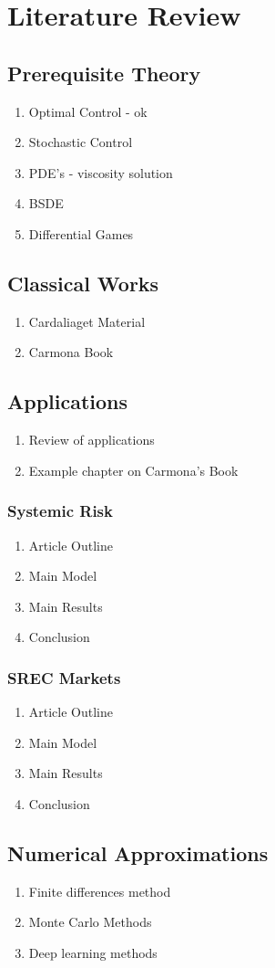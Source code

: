 \section{Literature Review}
\subsection{Prerequisite Theory}
\begin{enumerate}
    \item Optimal Control - ok
    \item Stochastic Control
    \item PDE's - viscosity solution
    \item BSDE
    \item Differential Games
\end{enumerate}

\subsection{Classical Works}
\begin{enumerate}
    \item Cardaliaget Material
    \item Carmona Book
\end{enumerate}

\subsection{Applications}
\begin{enumerate}
    \item Review of applications
    \item Example chapter on Carmona's Book
\end{enumerate}

\subsubsection{Systemic Risk}

\begin{enumerate}
    \item Article Outline
    \item Main Model
    \item Main Results
    \item Conclusion
\end{enumerate}

\subsubsection{SREC Markets}

\begin{enumerate}
    \item Article Outline
    \item Main Model
    \item Main Results
    \item Conclusion
\end{enumerate}

\subsection{Numerical Approximations}
\begin{enumerate}
    \item Finite differences method
    \item Monte Carlo Methods
    \item Deep learning methods
\end{enumerate}